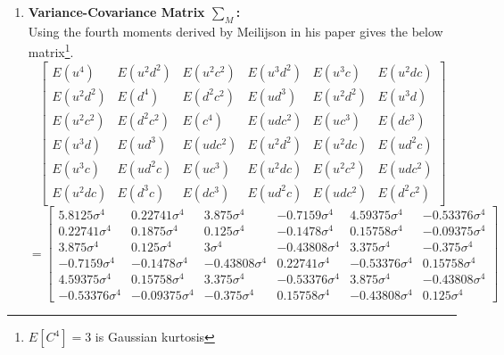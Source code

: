 \documentclass[12pt]{article}   	%
\begin{document}
\begin{enumerate}
\item \textbf{Variance-Covariance Matrix $\sum_{M} $:}\\
Using the fourth moments derived by Meilijson in his paper gives the below matrix\footnote{$E[C^4]=3$ is Gaussian kurtosis\cite{meilijson2008}}.
 $$  \begin{bmatrix}
			E(u^4 )&E(u^2 d^2 )&E(u^2 c^2)&E(u^3 d^2 )&E(u^3 c )&E(u^2 dc)\\
			E(u^2 d^2 )&E(d^4 )&E(d^2 c^2 )&E(u d^3 )&E(u^2 d^2 )&E(u^3 d)\\
			E(u^2 c^2 )&E(d^2 c^2)&E(c^4)&E(udc^2 )&E(uc^3 )&E(dc^3)\\
			E(u^3 d)&E(ud^3 )&E(udc^2 )&E(u^2d^2 )&E(u^2 dc )&E(ud^2c)\\
			E(u^3 c )&E(ud^2 c)&E(uc^3)&E(u^2dc )&E(u^2c^2 )&E(udc^2)\\
			E(u^2 dc)&E(d^3c )&E(dc^3 )&E(ud^2c )&E(udc^2 )&E(d^2c^2)
			\end{bmatrix}$$
$$=\begin{bmatrix}
5.8125\sigma^4&0.22741\sigma^4&3.875\sigma^4&-0.7159\sigma^4&4.59375\sigma^4&-0.53376\sigma^4\\0.22741\sigma^4&0.1875\sigma^4&0.125\sigma^4&-0.1478\sigma^4&0.15758\sigma^4&-0.09375\sigma^4\\3.875\sigma^4&0.125\sigma^4&3\sigma^4&-0.43808\sigma^4&3.375\sigma^4&-0.375\sigma^4\\-0.7159\sigma^4&-0.1478\sigma^4&-0.43808\sigma^4&0.22741\sigma^4&-0.53376\sigma^4&0.15758\sigma^4\\4.59375\sigma^4&0.15758\sigma^4&3.375\sigma^4&-0.53376\sigma^4&3.875\sigma^4&-0.43808\sigma^4\\-0.53376\sigma^4&-0.09375\sigma^4&-0.375\sigma^4&0.15758\sigma^4&-0.43808\sigma^4&0.125\sigma^4 
\end{bmatrix}$$


\end{enumerate}
\end{document}
